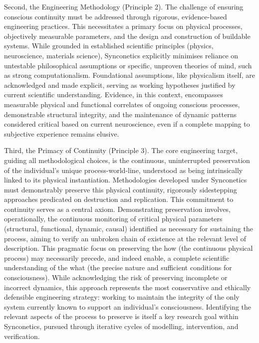 \documentclass[10pt]{article}
\begin{document}
\begin{sloppypar}
  Second, the Engineering Methodology (Principle 2). The challenge of ensuring conscious continuity must be addressed through rigorous, evidence-based engineering practices. This necessitates a primary focus on physical processes, objectively measurable parameters, and the design and construction of buildable systems. While grounded in established scientific principles (physics, neuroscience, materials science), Synconetics explicitly minimises reliance on untestable philosophical assumptions or specific, unproven theories of mind, such as strong computationalism. Foundational assumptions, like physicalism itself, are acknowledged and made explicit, serving as working hypotheses justified by current scientific understanding. Evidence, in this context, encompasses measurable physical and functional correlates of ongoing conscious processes, demonstrable structural integrity, and the maintenance of dynamic patterns considered critical based on current neuroscience, even if a complete mapping to subjective experience remains elusive.

  Third, the Primacy of Continuity (Principle 3). The core engineering target, guiding all methodological choices, is the continuous, uninterrupted preservation of the individual's unique process-world-line, understood as being intrinsically linked to its physical instantiation. Methodologies developed under Synconetics must demonstrably preserve this physical continuity, rigorously sidestepping approaches predicated on destruction and replication. This commitment to continuity serves as a central axiom. Demonstrating preservation involves, operationally, the continuous monitoring of critical physical parameters (structural, functional, dynamic, causal) identified as necessary for sustaining the process, aiming to verify an unbroken chain of existence at the relevant level of description. This pragmatic focus on preserving the how (the continuous physical process) may necessarily precede, and indeed enable, a complete scientific understanding of the what (the precise nature and sufficient conditions for consciousness). While acknowledging the risk of preserving incomplete or incorrect dynamics, this approach represents the most conservative and ethically defensible engineering strategy: working to maintain the integrity of the only system currently known to support an individual's consciousness. Identifying the relevant aspects of the process to preserve is itself a key research goal within Synconetics, pursued through iterative cycles of modelling, intervention, and verification.


\end{sloppypar}
\end{document}
